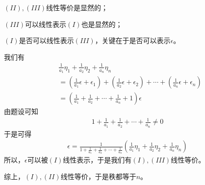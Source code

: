 \documentclass{article}
\begin{document}
$(II), (III)$线性等价是显然的；

$(III)$可以线性表示$(I)$也是显然的；

$(I)$是否可以线性表示$(III)$，关键在于是否可以表示$\epsilon$。

我们有
\begin{align*}
   & \frac{1}{a_1}\eta_1 + \frac{1}{a_2}\eta_2 + \frac{1}{a_n} \eta_n                \\
   & = (\frac{1}{a_1} \epsilon + \epsilon_1) + (\frac{1}{a_2} \epsilon + \epsilon_2)
  + \cdots + (\frac{1}{a_n} \epsilon + \epsilon_n)                                   \\
   & = (\frac{1}{a_1} + \frac{1}{a_2}+\cdots+ \frac{1}{a_n} + 1) \epsilon
\end{align*}
由题设可知
\begin{align*}
  1 + \frac{1}{a_1} + \frac{1}{a_2} + \cdots + \frac{1}{a_n} \neq 0
\end{align*}
于是可得
\begin{align*}
  \epsilon = \frac{1}{1 + \frac{1}{a_1} + \frac{1}{a_2} + \cdots + \frac{1}{a_n}} (\frac{1}{a_1}\eta_1 + \frac{1}{a_2}\eta_2 + \frac{1}{a_n} \eta_n           )
\end{align*}
所以，$\epsilon$可以被$(I)$线性表示，于是我们有$(I), (III)$线性等价。

综上，$(I),(II)$线性等价，于是秩都等于$n$。
\end{document}
